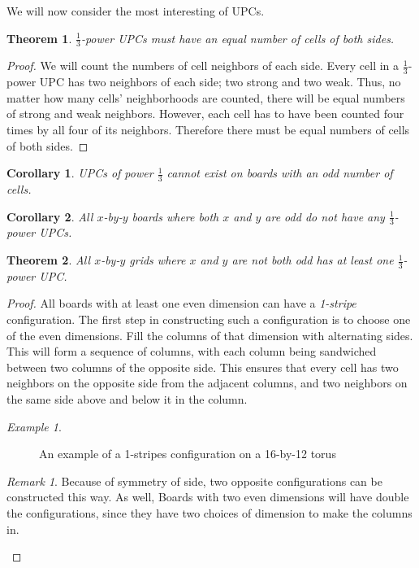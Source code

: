 \documentclass[12pt]{article}
\newtheorem{theorem}{Theorem}%
\newtheorem{corollary}{Corollary}%
\theoremstyle{definition}
\theoremstyle{remark}
\newtheorem{remark}{Remark}%
\theoremstyle{remark}
\newtheorem{example}{Example}%
\begin{document}
\par
We will now consider the most interesting of UPCs. %
\begin{theorem}
\label{13evenThm}
$\frac{1}{3}$-power UPCs must have an equal number of cells of both sides.
\end{theorem}
\begin{proof}
We will count the numbers of cell neighbors of each side. Every cell in a $\frac{1}{3}$-power UPC has two neighbors of each side; two strong and two weak. Thus, no matter how many cells' neighborhoods are counted, there will be equal numbers of strong and weak neighbors. However, each cell has to have been counted four times by all four of its neighbors. Therefore there must be equal numbers of cells of both sides. 

% 
\end{proof}
\begin{corollary}
UPCs of power $\frac{1}{3}$ cannot exist on boards with an odd number of cells.
\end{corollary}
\begin{corollary}
All $x$-by-$y$ boards where both $x$ and $y$ are odd do not have any $\frac{1}{3}$-power UPCs. 
\end{corollary}
\begin{theorem}
All $x$-by-$y$ grids where $x$ and $y$ are not both odd has at least one $\frac{1}{3}$-power UPC.  
\end{theorem}
\begin{proof}
All boards with at least one even dimension can have a \textit{1-stripe} configuration. The first step in constructing such a configuration is to choose one of the even dimensions. Fill the columns of that dimension with alternating sides. This will form a sequence of columns, with each column being sandwiched between two columns of the opposite side. This ensures that every cell has two neighbors on the opposite side from the adjacent columns, and two neighbors on the same side above and below it in the column.
\begin{example}
\begin{figure}[H]
  \centering
  \caption{An example of a 1-stripes configuration on a 16-by-12 torus}
\end{figure}
\begin{remark}
Because of symmetry of side, two opposite configurations can be constructed this way. As well, Boards with two even dimensions will have double the configurations, since they have two choices of dimension to make the columns in. 
\end{remark}
\end{example}
\end{proof}
\end{document}
